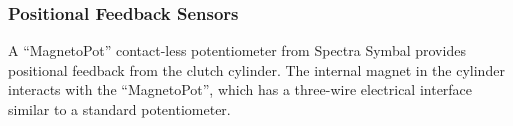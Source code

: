 \subsubsection{Positional Feedback Sensors}

A ``MagnetoPot'' contact-less potentiometer from Spectra Symbal provides positional feedback from the clutch cylinder. The internal magnet in the cylinder interacts with the ``MagnetoPot'', which has a three-wire electrical interface similar to a standard potentiometer.
